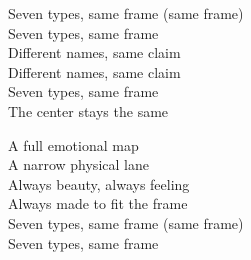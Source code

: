 \begin{lyrics}
Seven types, same frame (same frame)\\
Seven types, same frame\\
Different names, same claim\\
Different names, same claim\\
Seven types, same frame\\
The center stays the same

A full emotional map\\
A narrow physical lane\\
Always beauty, always feeling\\
Always made to fit the frame\\
Seven types, same frame (same frame)\\
Seven types, same frame
\end{lyrics}

